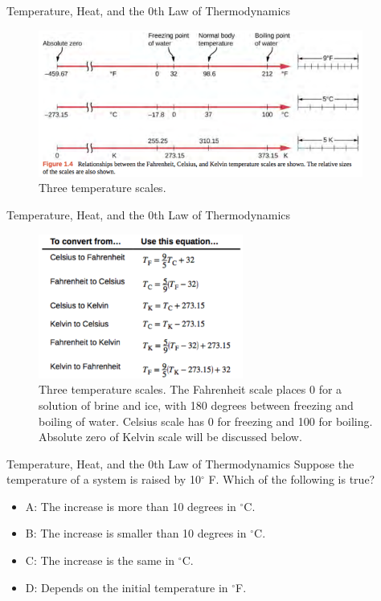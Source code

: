 \documentclass{beamer}
\begin{document}
\begin{frame}{Temperature, Heat, and the 0th Law of Thermodynamics}
\begin{figure}
\centering
\includegraphics[width=0.95\textwidth,trim=0cm 1.5cm 0cm 0cm,clip=true]{figures/temp1.png}
\caption{\label{fig:temp1} Three temperature scales.}
\end{figure}
\end{frame}

\begin{frame}{Temperature, Heat, and the 0th Law of Thermodynamics}
\begin{figure}
\centering
\includegraphics[width=0.6\textwidth]{figures/temp2.png}
\caption{\label{fig:temp2} Three temperature scales.  The Fahrenheit scale places 0 for a solution of brine and ice, with 180 degrees between freezing and boiling of water.  Celsius scale has 0 for freezing and 100 for boiling.  Absolute zero of Kelvin scale will be discussed below.}
\end{figure}
\end{frame}

\begin{frame}{Temperature, Heat, and the 0th Law of Thermodynamics}
Suppose the temperature of a system is raised by 10$^{\circ}$ F.  Which of the following is true?
\begin{itemize}
\item A: The increase is more than 10 degrees in $^{\circ}$C.
\item B: The increase is smaller than 10 degrees in $^{\circ}$C.
\item C: The increase is the same in $^{\circ}$C.
\item D: Depends on the initial temperature in $^{\circ}$F.
\end{itemize}
\end{frame}
\end{document}
